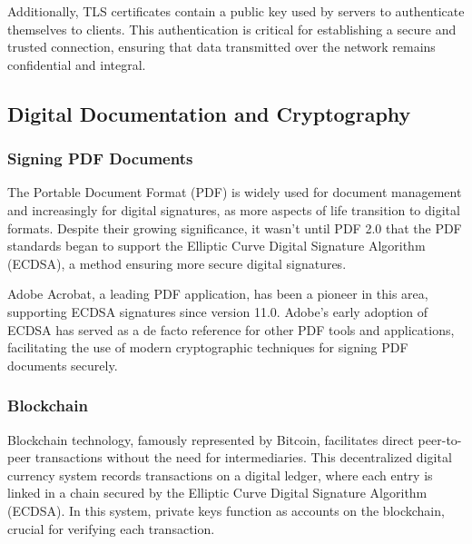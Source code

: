 Additionally, TLS certificates contain a public key used by servers to authenticate themselves to clients. This authentication is critical for establishing a secure and trusted connection, ensuring that data transmitted over the network remains confidential and integral.


\subsection{Digital Documentation and Cryptography}

\subsubsection{Signing PDF Documents}

The Portable Document Format (PDF) is widely used for document management and increasingly for digital signatures, as more aspects of life transition to digital formats. Despite their growing significance, it wasn't until PDF 2.0 that the PDF standards began to support the Elliptic Curve Digital Signature Algorithm (ECDSA), a method ensuring more secure digital signatures.

Adobe Acrobat, a leading PDF application, has been a pioneer in this area, supporting ECDSA signatures since version 11.0. Adobe’s early adoption of ECDSA has served as a de facto reference for other PDF tools and applications, facilitating the use of modern cryptographic techniques for signing PDF documents securely. \cite{Gavenda2021}


\subsubsection{Blockchain}


Blockchain technology, famously represented by Bitcoin, facilitates direct peer-to-peer transactions without the need for intermediaries. This decentralized digital currency system records transactions on a digital ledger, where each entry is linked in a chain secured by the Elliptic Curve Digital Signature Algorithm (ECDSA). In this system, private keys function as accounts on the blockchain, crucial for verifying each transaction. \cite{Varma2018}


